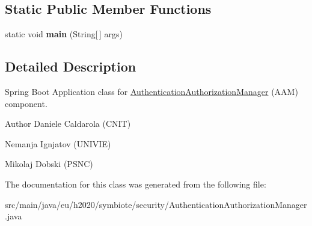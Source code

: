\subsection*{Static Public Member Functions}
\begin{DoxyCompactItemize}
\item 
static void {\bfseries main} (String\mbox{[}$\,$\mbox{]} args)\hypertarget{classeu_1_1h2020_1_1symbiote_1_1security_1_1AuthenticationAuthorizationManager_a2fc88f9c6ed7f8a92e718d96b56443c0}{}\label{classeu_1_1h2020_1_1symbiote_1_1security_1_1AuthenticationAuthorizationManager_a2fc88f9c6ed7f8a92e718d96b56443c0}

\end{DoxyCompactItemize}


\subsection{Detailed Description}
Spring Boot Application class for \hyperlink{classeu_1_1h2020_1_1symbiote_1_1security_1_1AuthenticationAuthorizationManager}{Authentication\+Authorization\+Manager} (A\+AM) component.

\begin{DoxyAuthor}{Author}
Daniele Caldarola (C\+N\+IT) 

Nemanja Ignjatov (U\+N\+I\+V\+IE) 

Mikolaj Dobski (P\+S\+NC) 
\end{DoxyAuthor}


The documentation for this class was generated from the following file\+:\begin{DoxyCompactItemize}
\item 
src/main/java/eu/h2020/symbiote/security/Authentication\+Authorization\+Manager.\+java\end{DoxyCompactItemize}
